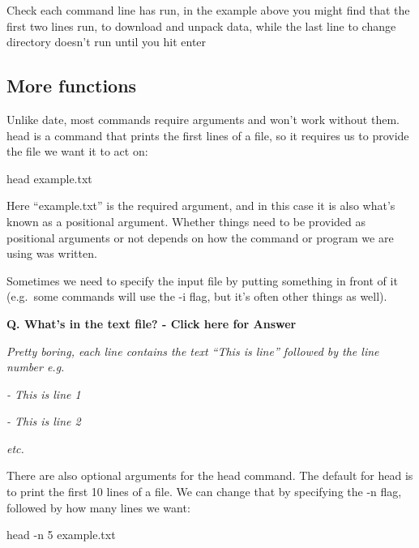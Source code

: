 \documentclass[
]{book}
\makeatletter
\newenvironment{Shaded}{\begin{snugshade}}{\end{snugshade}}
\newcommand{\AttributeTok}[1]{\textcolor[rgb]{0.77,0.63,0.00}{#1}}
\newcommand{\FunctionTok}[1]{\textcolor[rgb]{0.00,0.00,0.00}{#1}}
\newcommand{\NormalTok}[1]{#1}
\newenvironment{kframe}{%
\medskip{}
\setlength{\fboxsep}{.8em}
 \def\at@end@of@kframe{}%
 \ifinner\ifhmode%
  \def\at@end@of@kframe{\end{minipage}}%
  \begin{minipage}{\columnwidth}%
 \fi\fi%
 \def\FrameCommand##1{\hskip\@totalleftmargin \hskip-\fboxsep
 \colorbox{shadecolor}{##1}\hskip-\fboxsep
     \hskip-\linewidth \hskip-\@totalleftmargin \hskip\columnwidth}%
 \MakeFramed {\advance\hsize-\width
   \@totalleftmargin\z@ \linewidth\hsize
   \@setminipage}}%
 {\par\unskip\endMakeFramed%
 \at@end@of@kframe}
\newenvironment{block}[1]
  {
  \begin{itemize}
  \renewcommand{\labelitemi}{
    \raisebox{-.7\height}[0pt][0pt]{
      {\setkeys{Gin}{width=3em,keepaspectratio}\texttt{[image: images/\#1]}}
    }
  }
  \setlength{\fboxsep}{1em}
  \begin{kframe}
  \item
  }
  {
  \end{kframe}
  \end{itemize}
  }
\newenvironment{rmdwarning}
  {\begin{block}{warning}}
  {\end{block}}
\makeatother
\begin{document}
\begin{rmdwarning}
Check each command line has run, in the example above you might find
that the first two lines run, to download and unpack data, while the
last line to change directory doesn't run until you hit enter
\end{rmdwarning}

\hypertarget{more-functions}{%
\subsection{More functions}\label{more-functions}}

Unlike date, most commands require arguments and won't work without them. head is a command that prints the first lines of a file, so it requires us to provide the file we want it to act on:

\begin{Shaded}
\begin{Highlighting}[]
    \FunctionTok{head}\NormalTok{ example.txt}
\end{Highlighting}
\end{Shaded}

Here ``example.txt'' is the required argument, and in this case it is also what's known as a positional argument. Whether things need to be provided as positional arguments or not depends on how the command or program we are using was written.

Sometimes we need to specify the input file by putting something in front of it (e.g.~some commands will use the -i flag, but it's often other things as well).

\textbf{Q. What's in the text file? - Click here for Answer}

\emph{Pretty boring, each line contains the text ``This is line'' followed by the line number e.g.}

\emph{- This is line 1}

\emph{- This is line 2}

\emph{etc.}

There are also optional arguments for the head command. The default for head is to print the first 10 lines of a file. We can change that by specifying the -n flag, followed by how many lines we want:

\begin{Shaded}
\begin{Highlighting}[]
    \FunctionTok{head} \AttributeTok{{-}n}\NormalTok{ 5 example.txt}
\end{Highlighting}
\end{Shaded}
\end{document}
